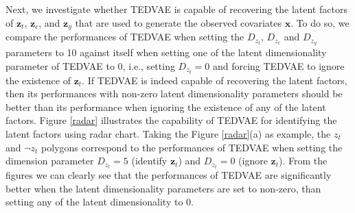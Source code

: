 \documentclass[letterpaper]{article} %
\begin{document}
Next, we investigate whether TEDVAE is capable of recovering the latent factors of $\mathbf{z}_t$, $\mathbf{z}_c$, and $\mathbf{z}_y$ that are used to generate the observed covariates $\mathbf{x}$. To do so, we compare the performances of TEDVAE when setting the $D_{z_t}$, $D_{z_c}$ and $D_{z_y}$ parameters to 10 against itself when setting one of the latent dimensionality parameter of TEDVAE to $0$, i.e., setting $D_{z_t}=0$ and forcing TEDVAE to ignore the existence of $\mathbf{z}_t$. If TEDVAE is indeed capable of recovering the latent factors, then its performances with non-zero latent dimensionality parameters should be better than its performance when ignoring the existence of any of the latent factors. 
Figure \ref{radar} illustrates the capability of TEDVAE for identifying the latent factors using radar chart. Taking the Figure \ref{radar}(a) as example, the $z_t$ and $\neg z_t$ polygons correspond to the performances of TEDVAE when setting the dimension parameter $D_{z_t}=5$ (identify $\mathbf{z}_t$) and $D_{z_t}=0$ (ignore $\mathbf{z}_t$). From the figures we can clearly see that the performances of TEDVAE are significantly better when the latent dimensionality parameters are set to non-zero, than setting any of the latent dimensionality to 0. 
\end{document}
